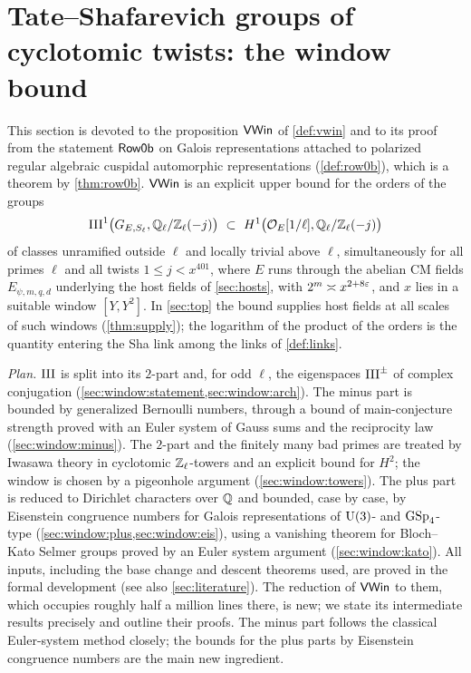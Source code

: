 \section{Tate--Shafarevich groups of cyclotomic twists: the window bound}\label{sec:window}

\providecommand{\windowQZ}{\Q_\ell/\Z_\ell}
\providecommand{\windowcyc}{\chi_{\mathrm{cyc}}}
\providecommand{\windowX}{\mathcal{X}}
\providecommand{\windowH}{\mathcal{H}}
\providecommand{\windowHf}{H^1_{f}}
\providecommand{\windowsh}{\mathrm{shaLen}}

This section is devoted to the proposition $\mathsf{VWin}$ of \cref{def:vwin} and to its proof from the
statement $\mathsf{Row0b}$ on Galois representations attached to polarized regular algebraic cuspidal
automorphic representations (\cref{def:row0b}), which is a theorem by \cref{thm:row0b}. $\mathsf{VWin}$ is an
explicit upper bound for the orders of the groups
\[
  \Sha^1\bigl(G_{E,S_\ell},\windowQZ(-j)\bigr)\ \subset\ H^1\bigl(\OO_E[1/\ell],\windowQZ(-j)\bigr)
\]
of classes unramified outside $\ell$ and locally trivial above $\ell$, simultaneously for all primes $\ell$ and all
twists $1\le j<x^{401}$, where $E$ runs through the abelian CM fields $E_{\psi,m,q,d}$ underlying the host fields
of \cref{sec:hosts}, with $2^m\asymp x^{2+8\varepsilon}$, and $x$ lies in a suitable window $[Y,Y^2]$. In \cref{sec:top}
the bound supplies host fields at all scales of such windows (\cref{thm:supply}); the logarithm of the product of
the orders is the quantity entering the Sha link among the links of \cref{def:links}.

\emph{Plan.} $\mathrm{III}$ is split into its $2$-part and, for odd $\ell$, the eigenspaces $\mathrm{III}^\pm$ of complex
conjugation (\cref{sec:window:statement,sec:window:arch}). The minus part is bounded by generalized Bernoulli
numbers, through a bound of main-conjecture strength proved with an Euler system of Gauss sums and the
reciprocity law (\cref{sec:window:minus}). The $2$-part and the finitely many bad primes are treated by Iwasawa
theory in cyclotomic $\mathbb{Z}_\ell$-towers and an explicit bound for $H^2$; the window is chosen by a pigeonhole
argument (\cref{sec:window:towers}). The plus part is reduced to Dirichlet characters over $\mathbb{Q}$ and bounded, case
by case, by Eisenstein congruence numbers for Galois representations of $\operatorname{U}(3)$- and $\operatorname{GSp}_4$-type
(\cref{sec:window:plus,sec:window:eis}), using a vanishing theorem for Bloch--Kato Selmer groups proved by an
Euler system argument (\cref{sec:window:kato}). All inputs, including the base change and descent theorems used,
are proved in the formal development \cite{LeanSource2026} (see also \cref{sec:literature}). The reduction of
$\mathsf{VWin}$ to them, which occupies roughly half a million lines there, is new; we state its intermediate
results precisely and outline their proofs. The minus part follows the classical Euler-system method closely; the
bounds for the plus parts by Eisenstein congruence numbers are the main new ingredient.

